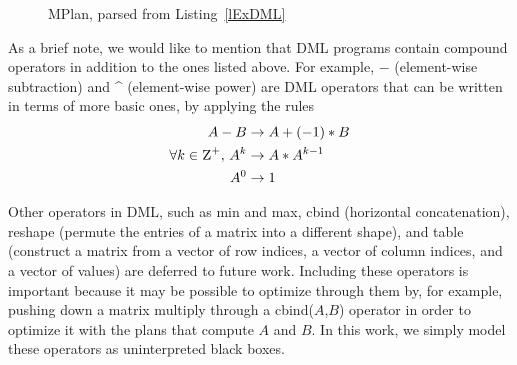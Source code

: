 \begin{figure}[tbh]
    \centering
{}
    \caption{MPlan, parsed from Listing~\ref{lExDML}}
    \label{fExMatrixDAG}
\end{figure}



As a brief note, we would like to mention that DML programs contain compound operators in addition to the ones listed above.
For example, $-$ (element-wise subtraction) and \^{} (element-wise power) are DML operators that can be written in terms of more basic ones, by applying the rules
\begin{align*}
A - B &\to A + (-1)*B \\
\forall k \in \textsc{Z}^+,\, A^k &\to A * A^{k-1} \\
A^0 &\to 1
\end{align*}

Other operators in DML, such as min and max, cbind (horizontal concatenation), reshape (permute the entries of a matrix into a different shape), and table (construct a matrix from a vector of row indices, a vector of column indices, and a vector of values) are deferred to future work. Including these operators is important because it may be possible to optimize through them by, for example, pushing down a matrix multiply through a cbind($A$,$B$) operator in order to optimize it with the plans that compute $A$ and $B$. In this work, we simply model these operators as uninterpreted black boxes.



